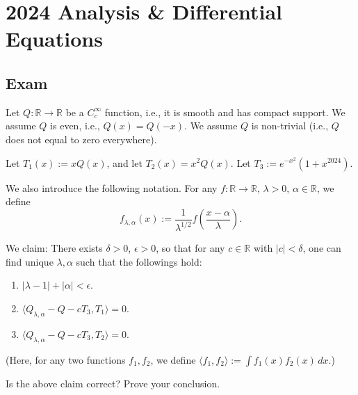 \section{2024 Analysis \& Differential Equations}

\subsection{Exam}

\begin{exercise}
\label{analysis:2024:1}
Let $Q:\mathbb{R}\to\mathbb{R}$ be a $C_c^{\infty}$ function, i.e., it is smooth and has compact support. We assume $Q$ is even, i.e., $Q(x)=Q(-x)$. We assume $Q$ is non-trivial (i.e., $Q$ does not equal to zero everywhere).

Let $T_1(x) := xQ(x)$, and let $T_2(x) = x^2 Q(x)$. Let $T_3 := e^{-x^2}(1+x^{2024})$.

We also introduce the following notation. For any $f:\mathbb{R}\to\mathbb{R}$, $\lambda>0$, $\alpha\in\mathbb{R}$, we define
\[
f_{\lambda, \alpha}(x) := \frac{1}{\lambda^{1/2}}f\left(\frac{x-\alpha}{\lambda}\right).
\]

We claim: There exists $\delta>0$, $\epsilon>0$, so that for any $c\in\mathbb{R}$ with $|c|<\delta$, one can find unique $\lambda,\alpha$ such that the followings hold:
\begin{enumerate}
\item $| \lambda-1 | + | \alpha | < \epsilon$.
\item $\langle Q_{\lambda,\alpha} - Q - cT_3, T_1 \rangle = 0$.
\item $\langle Q_{\lambda,\alpha} - Q - cT_3, T_2 \rangle = 0$.
\end{enumerate}
(Here, for any two functions $f_1,f_2$, we define $\langle f_1,f_2\rangle := \int f_1(x)f_2(x)\,dx$.)

Is the above claim correct? Prove your conclusion.
\end{exercise}

